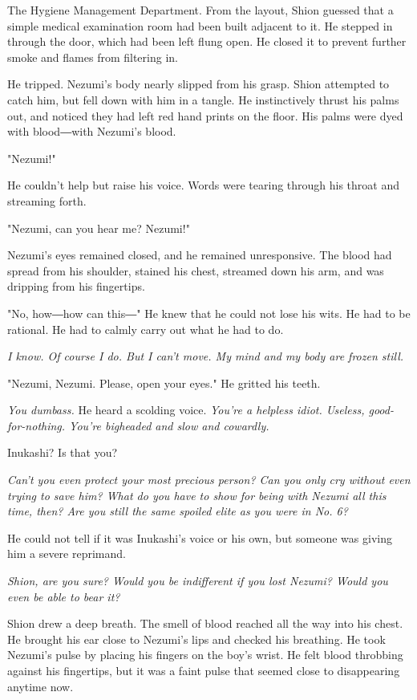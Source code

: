 The Hygiene Management Department. From the layout, Shion guessed that a
simple medical examination room had been built adjacent to it. He
stepped in through the door, which had been left flung open. He closed
it to prevent further smoke and flames from filtering in.

He tripped. Nezumi's body nearly slipped from his grasp. Shion attempted
to catch him, but fell down with him in a tangle. He instinctively
thrust his palms out, and noticed they had left red hand prints on the
floor. His palms were dyed with blood―with Nezumi's blood.

"Nezumi!"

He couldn't help but raise his voice. Words were tearing through his
throat and streaming forth.

"Nezumi, can you hear me? Nezumi!"

Nezumi's eyes remained closed, and he remained unresponsive. The blood
had spread from his shoulder, stained his chest, streamed down his arm,
and was dripping from his fingertips.

"No, how―how can this―" He knew that he could not lose his wits. He had
to be rational. He had to calmly carry out what he had to do.

\emph{I know. Of course I do. But I can't move. My mind and my body are frozen
still.}

"Nezumi, Nezumi. Please, open your eyes." He gritted his teeth.

\emph{You dumbass.} He heard a scolding voice. \emph{You're a helpless idiot.
Useless, good-for-nothing. You're bigheaded and slow and cowardly.}

Inukashi? Is that you?

\emph{Can't you even protect your most precious person? Can you only cry
without even trying to save him? What do you have to show for being with
Nezumi all this time, then? Are you still the same spoiled elite as you
were in No. 6?}

He could not tell if it was Inukashi's voice or his own, but someone was
giving him a severe reprimand.

\emph{Shion, are you sure? Would you be indifferent if you lost Nezumi? Would
you even be able to bear it?}

Shion drew a deep breath. The smell of blood reached all the way into
his chest. He brought his ear close to Nezumi's lips and checked his
breathing. He took Nezumi's pulse by placing his fingers on the boy's
wrist. He felt blood throbbing against his fingertips, but it was a
faint pulse that seemed close to disappearing anytime now.

